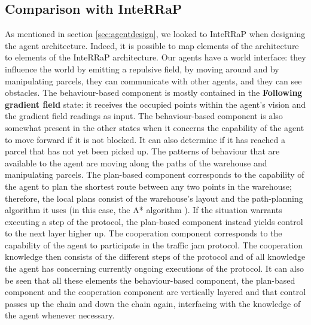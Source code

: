 \subsection{Comparison with InteRRaP}
As mentioned in section \ref{sec:agentdesign}, we looked to InteRRaP \cite{muller2011agent} when designing the agent architecture. Indeed, it is possible to map elements of the architecture to elements of the InteRRaP architecture. Our agents have a world interface: they influence the world by emitting a repulsive field, by moving around and by manipulating parcels, they can communicate with other agents, and they can see obstacles. The behaviour-based component is mostly contained in the \textbf{Following gradient field} state: it receives the occupied points within the agent's vision and the gradient field readings as input. The behaviour-based component is also somewhat present in the other states when it concerns the capability of the agent to move forward if it is not blocked. It can also determine if it has reached a parcel that has not yet been picked up. The patterns of behaviour that are available to the agent are moving along the paths of the warehouse and manipulating parcels. The plan-based component corresponds to the capability of the agent to plan the shortest route between any two points in the warehouse; therefore, the local plans consist of the warehouse's layout and the path-planning algorithm it uses (in this case, the A* algorithm \cite{wiki:astar}). If the situation warrants executing a step of the protocol, the plan-based component instead yields control to the next layer higher up. The cooperation component corresponds to the capability of the agent to participate in the traffic jam protocol. The cooperation knowledge then consists of the different steps of the protocol and of all knowledge the agent has concerning currently ongoing executions of the protocol. It can also be seen that all these elements the behaviour-based component, the plan-based component and the cooperation component are vertically layered and that control passes up the chain and down the chain again, interfacing with the knowledge of the agent whenever necessary.